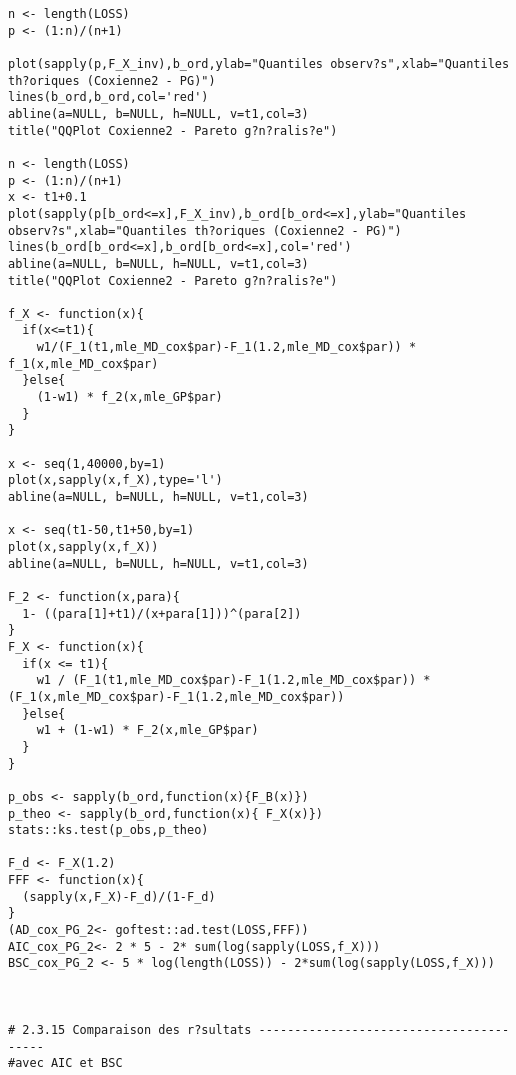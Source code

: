 \begin{verbatim}
n <- length(LOSS)
p <- (1:n)/(n+1)

plot(sapply(p,F_X_inv),b_ord,ylab="Quantiles observ?s",xlab="Quantiles th?oriques (Coxienne2 - PG)")
lines(b_ord,b_ord,col='red')
abline(a=NULL, b=NULL, h=NULL, v=t1,col=3)
title("QQPlot Coxienne2 - Pareto g?n?ralis?e")

n <- length(LOSS)
p <- (1:n)/(n+1)
x <- t1+0.1
plot(sapply(p[b_ord<=x],F_X_inv),b_ord[b_ord<=x],ylab="Quantiles observ?s",xlab="Quantiles th?oriques (Coxienne2 - PG)")
lines(b_ord[b_ord<=x],b_ord[b_ord<=x],col='red')
abline(a=NULL, b=NULL, h=NULL, v=t1,col=3)
title("QQPlot Coxienne2 - Pareto g?n?ralis?e")

f_X <- function(x){
  if(x<=t1){
    w1/(F_1(t1,mle_MD_cox$par)-F_1(1.2,mle_MD_cox$par)) * f_1(x,mle_MD_cox$par)
  }else{
    (1-w1) * f_2(x,mle_GP$par)
  }
}

x <- seq(1,40000,by=1)
plot(x,sapply(x,f_X),type='l')
abline(a=NULL, b=NULL, h=NULL, v=t1,col=3)

x <- seq(t1-50,t1+50,by=1)
plot(x,sapply(x,f_X))
abline(a=NULL, b=NULL, h=NULL, v=t1,col=3)

F_2 <- function(x,para){
  1- ((para[1]+t1)/(x+para[1]))^(para[2])
}
F_X <- function(x){
  if(x <= t1){
    w1 / (F_1(t1,mle_MD_cox$par)-F_1(1.2,mle_MD_cox$par)) * (F_1(x,mle_MD_cox$par)-F_1(1.2,mle_MD_cox$par))
  }else{
    w1 + (1-w1) * F_2(x,mle_GP$par)
  }
}

p_obs <- sapply(b_ord,function(x){F_B(x)})
p_theo <- sapply(b_ord,function(x){ F_X(x)})
stats::ks.test(p_obs,p_theo)

F_d <- F_X(1.2)
FFF <- function(x){
  (sapply(x,F_X)-F_d)/(1-F_d)
}
(AD_cox_PG_2<- goftest::ad.test(LOSS,FFF))
AIC_cox_PG_2<- 2 * 5 - 2* sum(log(sapply(LOSS,f_X)))
BSC_cox_PG_2 <- 5 * log(length(LOSS)) - 2*sum(log(sapply(LOSS,f_X)))



# 2.3.15 Comparaison des r?sultats ----------------------------------------
#avec AIC et BSC


\end{verbatim}
